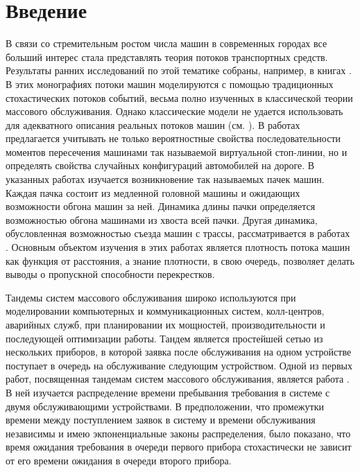 \documentclass[12pt]{extarticle}
\theoremstyle{theorem}
\theoremstyle{remark}
\begin{document}
\section{Введение}

В связи со стремительным ростом числа машин в современных городах все больший интерес стала представлять теория потоков транспортных средств. Результаты ранних исследований по этой тематике собраны, например, в книгах \cite{Haight:1963, Drew:1968, Inose:1975}. В этих монографиях потоки машин моделируются с помощью традиционных стохастических потоков событий, весьма полно изученных в классической теории массового обслуживания. Однако классические модели не удается использовать для адекватного описания реальных потоков машин (см. \cite{Bartlet:1963, Cox:1969,Dshalalov:1997}). В работах
\cite{Fedotkin:Kudryavcev:Rachinskaya:2010, Rachinskaya:Fedotkin:2011:1, Rachinskaya:Fedotkin:2014} предлагается учитывать не только вероятностные свойства последовательности моментов пересечения машинами так называемой виртуальной стоп-линии, но и определять свойства случайных конфигураций автомобилей на дороге. В указанных работах изучается возникновение так называемых пачек машин. Каждая пачка состоит из медленной головной машины и ожидающих возможности обгона машин за ней. Динамика длины пачки определяется возможностью обгона машинами из хвоста всей пачки. Другая динамика, обусловленная возможностью съезда машин с трассы, рассматривается в работах \cite{Afanasyeva:Bulinskaya:2013:1,Afanasyeva:Bulinskaya:2010,Afanasyeva:Bulinskaya:2013:2}. Основным объектом изучения в этих работах является плотность потока машин как функция от расстояния, а знание плотности, в свою очередь, позволяет делать выводы о пропускной способности перекрестков.

Тандемы систем массового обслуживания широко используются при моделировании компьютерных и коммуникационных систем, колл-центров, аварийных служб, при планировании их мощностей, производительности и последующей оптимизации работы. 
Тандем является простейшей сетью из нескольких приборов, в которой заявка после обслуживания на одном устройстве  поступает в очередь на обслуживание следующим устройством.
Одной из первых работ, посвященная тандемам систем массового обслуживания, является работа \cite{Reich:1957}. В ней изучается распределение времени пребывания требования в системе с двумя обслуживающими устройствами. В предположении, что промежутки времени между поступлением заявок в систему и времени обслуживания независимы и имею экпоненциальные законы распределения, было показано, что время ожидания требования в очереди первого прибора стохастически не зависит от его времени ожидания в очереди второго прибора. 
\end{document}
